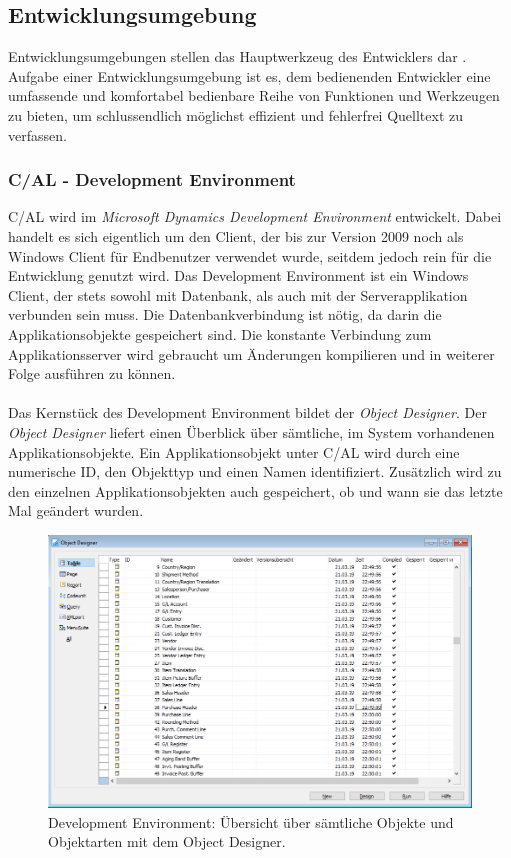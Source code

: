 \subsection{Entwicklungsumgebung}
Entwicklungsumgebungen stellen das Hauptwerkzeug des Entwicklers dar \cite{KahlertGiza2016}. Aufgabe einer Entwicklungsumgebung ist es, dem bedienenden Entwickler eine umfassende und komfortabel bedienbare Reihe von Funktionen und Werkzeugen zu bieten, um schlussendlich möglichst effizient und fehlerfrei Quelltext zu verfassen.

\subsubsection{C/AL - Development Environment}
C/AL wird im \textit{Microsoft Dynamics Development Environment} entwickelt. Dabei handelt es sich eigentlich um den Client, der bis zur Version 2009 noch als Windows Client für Endbenutzer verwendet wurde, seitdem jedoch rein für die Entwicklung genutzt wird. Das Development Environment ist ein Windows Client, der stets sowohl mit Datenbank, als auch mit der Serverapplikation verbunden sein muss. Die Datenbankverbindung ist nötig, da darin die Applikationsobjekte gespeichert sind. Die konstante Verbindung zum Applikationsserver wird gebraucht um Änderungen kompilieren und in weiterer Folge ausführen zu können.

\paragraph{}
Das Kernstück des Development Environment bildet der \textit{Object Designer}. Der \textit{Object Designer} liefert einen Überblick über sämtliche, im System vorhandenen Applikationsobjekte. Ein Applikationsobjekt unter C/AL wird durch eine numerische ID, den Objekttyp und einen Namen identifiziert. Zusätzlich wird zu den einzelnen Applikationsobjekten auch gespeichert, ob und wann sie das letzte Mal geändert wurden.

\begin{figure}[H]
	\centering
	\includegraphics[width=140mm]{images/ObjectDesigner}
	\caption{Development Environment: Übersicht über sämtliche Objekte und Objektarten mit dem Object Designer.}
	\label{fig:ObjectDesigner}
\end{figure}


